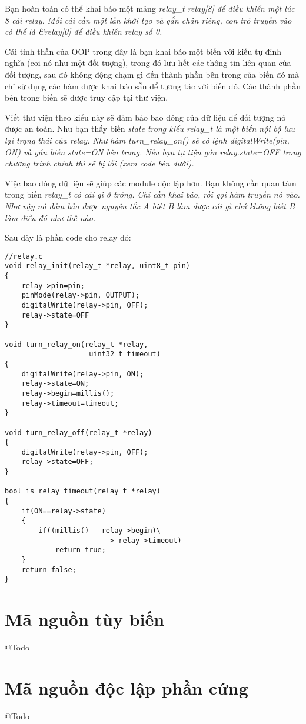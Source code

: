 Bạn hoàn toàn có thể khai báo một mảng \it{relay\_t relay[8]} để điều khiển một lúc 8 cái relay. Mỗi cái cần một lần khởi tạo và gắn chân riêng, con trỏ truyền vào có thể là \it{\&relay[0]} để điều khiển relay số 0.

Cái tinh thần của OOP trong đây là bạn khai báo một biến với kiểu tự định nghĩa (coi nó như một đối tượng), trong đó lưu hết các thông tin liên quan của đối tượng, sau đó không động chạm gì đến thành phần bên trong của biến đó mà chỉ sử dụng các hàm được khai báo sẵn để tương tác với biến đó. Các thành phần bên trong biến sẽ được truy cập tại thư viện. 

Viết thư viện theo kiểu này sẽ đảm bảo bao đóng của dữ liệu để đối tượng nó được an toàn. Như bạn thấy biến \it{state} trong kiểu \it{relay\_t} là một biến nội bộ lưu lại trạng thái của relay. Như hàm \it{turn\_relay\_on()} sẽ có lệnh \it{digitalWrite(pin, ON)} và gán biến \it{state=ON} bên trong. Nếu bạn tự tiện gán \it{relay.state=OFF} trong chương trình chính thì sẽ bị lỗi (xem code bên dưới).

Việc bao đóng dữ liệu sẽ giúp các module độc lập hơn. Bạn không cần quan tâm trong biến \it{relay\_t} có cái gì ở trỏng. Chỉ cần khai báo, rồi gọi hàm truyền nó vào. Như vậy nó đảm bảo được nguyên tắc A biết B làm được cái gì chứ không biết B làm điều đó như thế nào.

Sau đây là phần code cho relay đó:
\begin{lstlisting}
//relay.c
void relay_init(relay_t *relay, uint8_t pin)
{
	relay->pin=pin;
	pinMode(relay->pin, OUTPUT);
	digitalWrite(relay->pin, OFF);
	relay->state=OFF
}

void turn_relay_on(relay_t *relay,
					uint32_t timeout)
{
	digitalWrite(relay->pin, ON);
	relay->state=ON;
	relay->begin=millis();
	relay->timeout=timeout;
}

void turn_relay_off(relay_t *relay)
{
	digitalWrite(relay->pin, OFF);
	relay->state=OFF;
}

bool is_relay_timeout(relay_t *relay)
{
	if(ON==relay->state) 
	{
		if((millis() - relay->begin)\
						 > relay->timeout)
			return true;
	}
	return false;
}

\end{lstlisting}

\section{Mã nguồn tùy biến}

@Todo

\section{Mã nguồn độc lập phần cứng}

@Todo